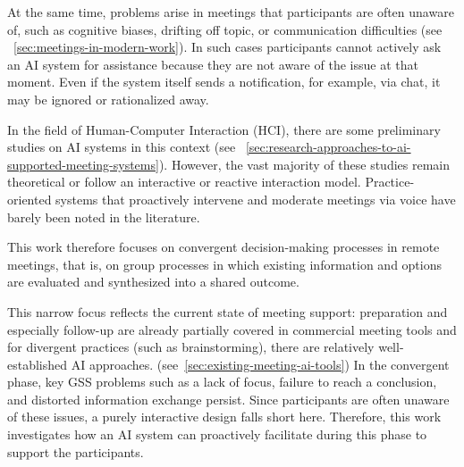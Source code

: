 At the same time, problems arise in meetings that participants are often unaware of, such as
cognitive biases, drifting off topic, or communication difficulties (see ~\ref{sec:meetings-in-modern-work}).
In such cases participants cannot actively ask an AI system for assistance because they are not aware of the
issue at that moment. Even if the system itself sends a notification, for example, via chat, it may be ignored or
rationalized away. \cite["4.4.3 Intervene"]{houttiObserveAskIntervene2025}

In the field of Human-Computer Interaction (HCI), there are some preliminary studies on AI systems in this
context (see ~\ref{sec:research-approaches-to-ai-supported-meeting-systems}). However, the vast majority of
these studies remain theoretical or follow an interactive or reactive interaction model.
Practice-oriented systems that proactively intervene and moderate meetings via voice have
barely been noted in the literature.

This work therefore focuses on convergent decision-making processes in remote meetings, that is, on group
processes in which existing information and options are evaluated and synthesized into a shared outcome.

This narrow focus reflects the current state of meeting support: preparation and especially follow-up are already
partially covered in commercial meeting tools and for divergent practices (such as brainstorming), there are
relatively well-established AI approaches. (see~\ref{sec:existing-meeting-ai-tools})
In the convergent phase, key GSS problems such as a lack of focus, failure to reach a conclusion, and
distorted information exchange persist. Since participants are often unaware of these issues, a purely
interactive design falls short here. Therefore, this work investigates how an AI system can proactively facilitate
during this phase to support the participants.




